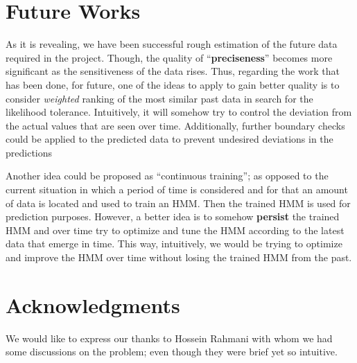 \documentclass{acm_proc_article-sp}
\begin{document}
\section{Future Works} \label{sec:future}
As it is revealing, we have been successful rough estimation of the future data required in the project. Though, the
quality of ``\textbf{preciseness}'' becomes more significant as the sensitiveness of the data rises. Thus, regarding
the work that has been done, for future, one of the ideas to apply to gain better quality is to consider
\textit{weighted} ranking of the most similar past data in search for the likelihood tolerance. Intuitively, it will
somehow try to control the deviation from the actual values that are seen over time. Additionally, further boundary
checks could be applied to the predicted data to prevent undesired deviations in the predictions

Another idea could be proposed as ``continuous training''; as opposed to the current situation in which a period of
time is considered and for that an amount of data is located and used to train an HMM. Then the trained HMM is used for
prediction purposes. However, a better idea is to somehow \textbf{persist} the trained HMM and over time try to
optimize and tune the HMM according to the latest data that emerge in time. This way, intuitively, we would be trying
to optimize and improve the HMM over time without losing the trained HMM from the past.

\section{Acknowledgments} \label{sec:ack}
We would like to express our thanks to Hossein Rahmani with whom we had some discussions on the problem; even though
they were brief yet so intuitive.



\end{document}
